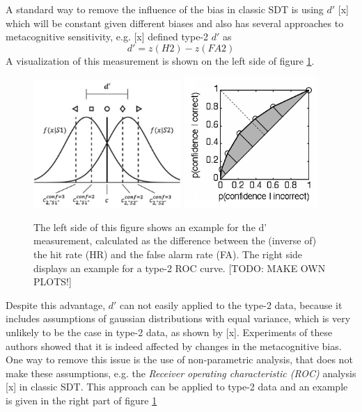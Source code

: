 \documentclass[../main/main.tex]{subfiles}
\begin{document}
	A standard way to remove the influence of the bias in classic SDT is using $d'$ [x] which will be constant given different biases and also has several approaches to metacognitive sensitivity, e.g. [x] defined type-2 $d'$ as
	\begin{displaymath}
		d' = z(H2) - z(FA2)
	\end{displaymath}
	A visualization of this measurement is shown on the left side of figure \ref{fig:d_dash_and_roc}.
	\begin{figure}[h]
		\centering
		\captionsetup{justification=centering}
		\includegraphics[width=0.5\textwidth]{../assets/d_dash.png}
		\includegraphics[width=0.45\textwidth]{../assets/type1_roc.png}
		\caption{The left side of this figure shows an example for the d' measurement, calculated as the difference between the (inverse of) the hit rate (HR) and the false alarm rate (FA). The right side displays an example for a type-2 ROC curve. [TODO: MAKE OWN PLOTS!]} 
		\label{fig:d_dash_and_roc}
	\end{figure}
	Despite this advantage, $d'$ can not easily applied to the type-2 data, because it includes assumptions of gaussian distributions with equal variance, which is very unlikely to be the case in type-2 data, as shown by [x]. Experiments of these authors showed that it is indeed affected by changes in the metacognitive bias.\\
	One way to remove this issue is the use of non-parametric analysis, that does not make these assumptions, e.g. the \textit{Receiver operating characteristic (ROC)} analysis [x] in classic SDT. This approach can be applied to type-2 data and an example is given in the right part of figure \ref{fig:d_dash_and_roc}\\
\end{document}
